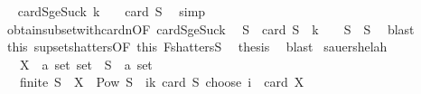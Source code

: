 \begin{isabellebody}
\ \isamarkupfalse%
\ card{\isacharunderscore}{\kern0pt}S{\isacharunderscore}{\kern0pt}ge{\isacharunderscore}{\kern0pt}Suc{\isacharunderscore}{\kern0pt}k{\isacharcolon}{\kern0pt}\ {\isachardoublequoteopen}k\ {\isacharplus}{\kern0pt}\ {}\ {\isasymle}\ card\ S{\isachardoublequoteclose}\ \isamarkupfalse%
\ simp\isanewline
\ \ \isamarkupfalse%
\ obtain{\isacharunderscore}{\kern0pt}subset{\isacharunderscore}{\kern0pt}with{\isacharunderscore}{\kern0pt}card{\isacharunderscore}{\kern0pt}n{\isacharbrackleft}{\kern0pt}OF\ card{\isacharunderscore}{\kern0pt}S{\isacharunderscore}{\kern0pt}ge{\isacharunderscore}{\kern0pt}Suc{\isacharunderscore}{\kern0pt}k{\isacharbrackright}{\kern0pt}\ \isamarkupfalse%
\ S{\isacharprime}{\kern0pt}\ \ {\isachardoublequoteopen}card\ S{\isacharprime}{\kern0pt}\ {\isacharequal}{\kern0pt}\ k\ {\isacharplus}{\kern0pt}\ {}{\isachardoublequoteclose}\ \ {\isachardoublequoteopen}S{\isacharprime}{\kern0pt}\ {\isasymsubseteq}\ S{\isachardoublequoteclose}\ \isamarkupfalse%
\ blast\isanewline
\ \ \isamarkupfalse%
\ this{\isacharparenleft}{\kern0pt}{}{\isacharparenright}{\kern0pt}\ supset{\isacharunderscore}{\kern0pt}shatters{\isacharbrackleft}{\kern0pt}OF\ this{\isacharparenleft}{\kern0pt}{}{\isacharparenright}{\kern0pt}\ F{\isacharunderscore}{\kern0pt}shatters{\isacharunderscore}{\kern0pt}S{\isacharbrackright}{\kern0pt}\ \isamarkupfalse%
\ {\isacharquery}{\kern0pt}thesis\ \isamarkupfalse%
\ blast\isanewline
{}\isamarkupfalse%
%
\endisatagproof
{\isafoldproof}%
%
\isadelimproof
%
\endisadelimproof
%
\isadelimdocument
%
\endisadelimdocument
%
\isatagdocument
%
\isamarkuptrue%
%
\endisatagdocument
{\isafolddocument}%
%
\isadelimdocument
%
\endisadelimdocument
{}\isamarkupfalse%
\ sauer{\isacharunderscore}{\kern0pt}shelah{\isacharunderscore}{\kern0pt}{}{\isacharcolon}{\kern0pt}\isanewline
\ \ \ X\ {\isacharcolon}{\kern0pt}{\isacharcolon}{\kern0pt}\ {\isachardoublequoteopen}{\isacharprime}{\kern0pt}a\ set\ set{\isachardoublequoteclose}\ \ S\ {\isacharcolon}{\kern0pt}{\isacharcolon}{\kern0pt}\ {\isachardoublequoteopen}{\isacharprime}{\kern0pt}a\ set{\isachardoublequoteclose}\isanewline
\ \ \ {\isachardoublequoteopen}finite\ S{\isachardoublequoteclose}\ \ {\isachardoublequoteopen}X\ {\isasymsubseteq}\ Pow\ S{\isachardoublequoteclose}\ \ {\isachardoublequoteopen}{\isacharparenleft}{\kern0pt}{\isasymSum}i{\isasymle}k{\isachardot}{\kern0pt}\ card\ S\ choose\ i{\isacharparenright}{\kern0pt}\ {\isacharless}{\kern0pt}\ card\ X{\isachardoublequoteclose}\isanewline

\end{isabellebody}
